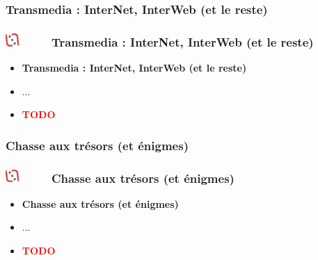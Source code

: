 \documentclass[slidetop,11pt]{beamer}
\def\sectionPartIIbI{Transmedia : InterNet, InterWeb (et le reste)}
\def\sectionPartIIbII{Chasse aux tr{\'e}sors (et {\'e}nigmes)}
\def\moreInFrameTitleLeftt{\includegraphics[height=0.5cm]{img/ligueludique-0.png}~~~~~}
\begin{document}
\subsubsection{\sectionPartIIbI} %
\begin{frame}
	\frametitle{\moreInFrameTitleLeftt \sectionPartIIbI }
	\begin{itemize}
		\item \textbf{ \sectionPartIIbI }
		\item[] ...
		\item \textcolor{red}{ \textbf{TODO} }
	\end{itemize}
\end{frame} 

\subsubsection{\sectionPartIIbII} %
\begin{frame}
	\frametitle{\moreInFrameTitleLeftt \sectionPartIIbII }
	\begin{itemize}
		\item \textbf{ \sectionPartIIbII }
		\item[] ...
		\item \textcolor{red}{ \textbf{TODO} }
	\end{itemize}
\end{frame} 
\end{document}
